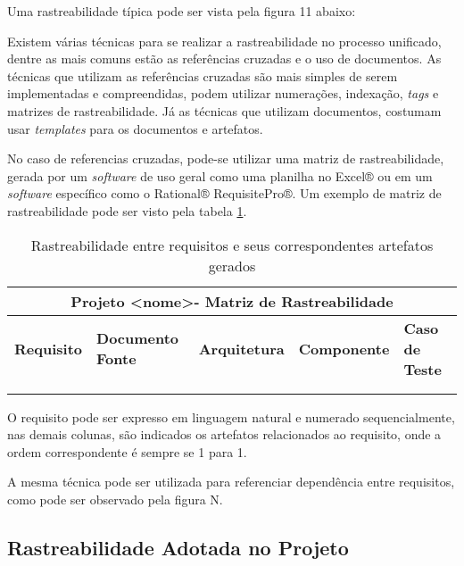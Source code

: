 Uma rastreabilidade típica pode ser vista pela figura 11 abaixo:

Existem várias técnicas para se realizar a rastreabilidade no processo unificado, dentre as mais comuns estão as referências cruzadas e o uso de documentos. As técnicas que utilizam as referências cruzadas são mais simples de serem implementadas e compreendidas, podem utilizar numerações, indexação, \textit{tags} e matrizes de rastreabilidade. Já as técnicas que utilizam documentos, costumam usar \textit{templates} para os documentos e artefatos.

No caso de referencias cruzadas, pode-se utilizar uma matriz de rastreabilidade, gerada por um \textit{software} de uso geral como uma planilha no Excel® ou em um \textit{software} específico como o Rational® RequisitePro®. Um exemplo de matriz de rastreabilidade pode ser visto pela tabela \ref{table1}.

\begin{table}[h]
\centering
\begin{tabular}{|l|l|l|l|l|}
\hline
\multicolumn{5}{|c|}{\textbf{Projeto \textless nome\textgreater - Matriz de Rastreabilidade}}           \\ \hline
\textbf{Requisito} & \textbf{Documento Fonte} & \multicolumn{1}{l|}{\textbf{Arquitetura}} & \textbf{Componente} & \textbf{Caso de Teste} \\ \hline
                   &                 &                                  &            &               \\ \hline
                   &                 &                                  &            &               \\ \hline
\end{tabular}
\label{table1}
\caption{Rastreabilidade entre requisitos e seus correspondentes artefatos gerados}
\end{table}

O requisito pode ser expresso em linguagem natural e numerado sequencialmente, nas demais colunas, são indicados os artefatos relacionados ao requisito, onde a ordem correspondente é sempre se 1 para 1.

A mesma técnica pode ser utilizada para referenciar dependência entre requisitos, como pode ser observado pela figura N.

\subsection{Rastreabilidade Adotada no Projeto}

